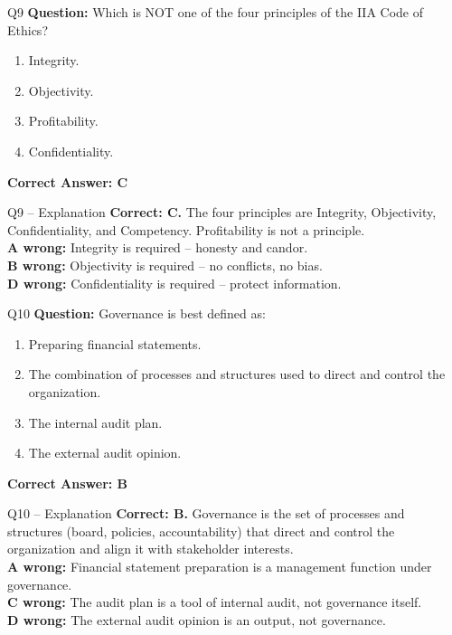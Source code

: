 \documentclass[aspectratio=169,10pt]{beamer}
\begin{document}
	\begin{frame}[t]{Q9}
		\small
		\textbf{Question:} Which is NOT one of the four principles of the IIA Code of Ethics?
		\begin{enumerate}[label=\Alph*.,itemsep=1pt,topsep=2pt]
			\item Integrity.
			\item Objectivity.
			\item Profitability.
			\item Confidentiality.
		\end{enumerate}
		\vspace{4pt}
		\textbf{Correct Answer: C}
	\end{frame}
	
	\begin{frame}[t]{Q9 -- Explanation}
		\small
		\textbf{Correct: C.} The four principles are Integrity, Objectivity, Confidentiality, and Competency. Profitability is not a principle. \\[4pt]
		\textbf{A wrong:} Integrity is required -- honesty and candor. \\[2pt]
		\textbf{B wrong:} Objectivity is required -- no conflicts, no bias. \\[2pt]
		\textbf{D wrong:} Confidentiality is required -- protect information.
	\end{frame}
	
	\begin{frame}[t]{Q10}
		\small
		\textbf{Question:} Governance is best defined as:
		\begin{enumerate}[label=\Alph*.,itemsep=1pt,topsep=2pt]
			\item Preparing financial statements.
			\item The combination of processes and structures used to direct and control the organization.
			\item The internal audit plan.
			\item The external audit opinion.
		\end{enumerate}
		\vspace{4pt}
		\textbf{Correct Answer: B}
	\end{frame}
	
	\begin{frame}[t]{Q10 -- Explanation}
		\small
		\textbf{Correct: B.} Governance is the set of processes and structures (board, policies, accountability) that direct and control the organization and align it with stakeholder interests. \\[4pt]
		\textbf{A wrong:} Financial statement preparation is a management function under governance. \\[2pt]
		\textbf{C wrong:} The audit plan is a tool of internal audit, not governance itself. \\[2pt]
		\textbf{D wrong:} The external audit opinion is an output, not governance.
	\end{frame}
	
\end{document}
